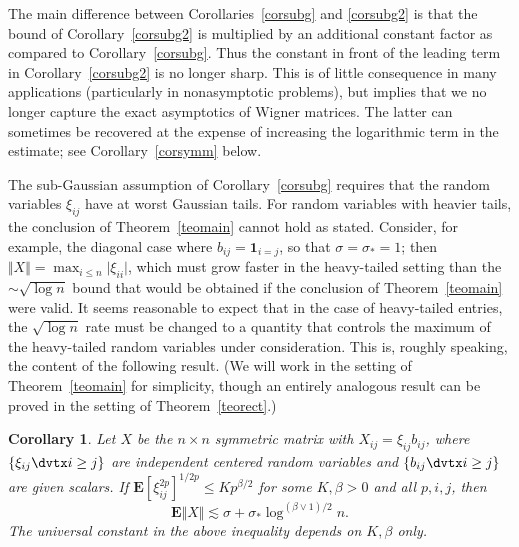 \documentclass[aop,MSNbibl,dvips]{arximspdf}
\newcommand{\rrvert}{\vert}
\newcommand{\rrVert}{\Vert}
\newcommand{\llvert}{\vert}
\newcommand{\llVert}{\Vert}
\newtheorem{cor}[teo]{Corollary}
\newcommand{\EE}{\mathbf{E}}
\begin{document}
%
\begin{rem}
The main difference between Corollaries~\ref{corsubg} and \ref{corsubg2}
is that the bound of Corollary~\ref{corsubg2} is multiplied by an
additional constant factor as compared to Corollary~\ref{corsubg}.
Thus the constant in front of the leading term in
Corollary~\ref{corsubg2} is no longer sharp.
This is of little consequence in many applications (particularly in
nonasymptotic problems), but implies that we no longer capture the exact
asymptotics of Wigner matrices. The latter can sometimes be recovered at
the expense of increasing the logarithmic term in the estimate; see
Corollary~\ref{corsymm} below.
\end{rem}

The sub-Gaussian assumption of Corollary~\ref{corsubg} requires that the
random variables $\xi_{ij}$ have at worst Gaussian tails. For random
variables with heavier tails, the conclusion of Theorem~\ref{teomain}
cannot hold as stated. Consider, for example, the diagonal case where
$b_{ij}=\mathbf{1}_{i=j}$, so that $\sigma=\sigma_*=1$; then
$\llVert X\rrVert =\max_{i\le n}\llvert \xi_{ii}\rrvert $, which
must grow faster in the
heavy-tailed setting than the $\sim\sqrt{\log n}$ bound that would be
obtained if the conclusion of Theorem~\ref{teomain} were valid.
It seems reasonable to expect that in the case of heavy-tailed entries,
the $\sqrt{\log n}$ rate must be changed to a quantity that controls the
maximum of the heavy-tailed random variables under consideration. This is,
roughly speaking, the content of the following result. (We will work in the
setting of Theorem~\ref{teomain} for simplicity, though an entirely
analogous result can be proved in the setting of Theorem~\ref{teorect}.)

%
\begin{cor}
\label{corheavy}
Let $X$ be the $n\times n$ symmetric matrix with
$X_{ij}=\xi_{ij}b_{ij}$, where $\{\xi_{ij}\dvtx i\ge j\}$ are independent
centered random variables and $\{b_{ij}\dvtx i\ge j\}$ are
given scalars. If $\EE[\xi_{ij}^{2p}]^{1/2p}\le Kp^{\beta/2}$ for some
$K,\beta>0$ and all $p,i,j$, then
%
\[
\EE\llVert X\rrVert\lesssim\sigma+ \sigma_*\log^{(\beta\vee1)/2}n. %
\]
%
The universal constant in the above inequality depends on $K,\beta$ only.
\end{cor}
\end{document}
